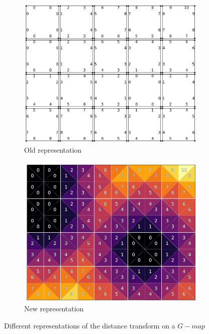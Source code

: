 \begin{figure}[h]
    \centering
    \begin{subfigure}{0.49\textwidth}
        \centering
        \includegraphics[width=\textwidth]{figures/gmap_dt_old.png}
        \caption{Old representation}
        \label{fig:gmap_dt_old}
    \end{subfigure}
    \hfill
    \begin{subfigure}{0.49\textwidth}
        \centering
        \includegraphics[width=\textwidth]{figures/gmap_dt_new.png}
        \caption{New representation}
        \label{fig:gmap_dt_new}
    \end{subfigure}
    \caption{Different representations of the distance transform on a $G-map$}
    \label{fig:gmap_dt}
\end{figure}

